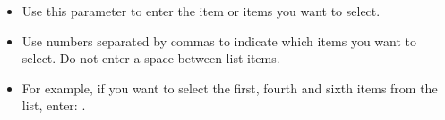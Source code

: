 \begin{itemize}
\item Use this parameter to enter the item or items you want to select.
\item Use numbers separated by commas to indicate which items you want to select. Do not enter a space between list items. 
\item For example, if you want to select the first, fourth and sixth items from the list, enter: .
\end{itemize}

      
